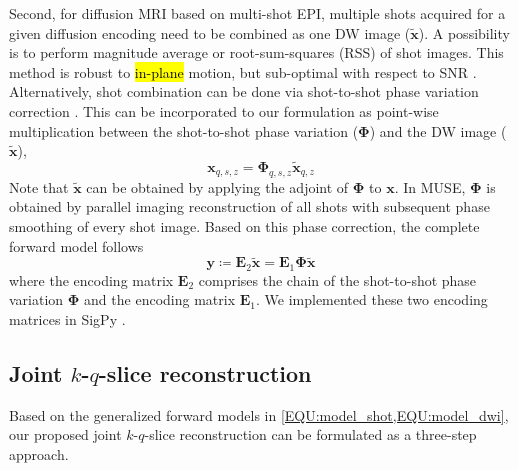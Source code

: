 \documentclass[preprint,12pt,authoryear,review]{elsarticle}
\begin{document}
    Second, for diffusion MRI based on multi-shot EPI,
    multiple shots acquired for a given diffusion encoding
    need to be combined as one DW image ($\mathbf{\tilde{x}}$).
    A possibility is to perform magnitude average \citep{chen_2013_muse}
    or root-sum-squares (RSS) \citep{mani_2017_mussels}
    of shot images.
    This method is robust to \hl{in-plane} motion, 
    but sub-optimal with respect to SNR
    \citep{guhaniyogi_2016_amuse}.
    Alternatively, shot combination can be done via shot-to-shot phase variation correction
    \citep{liu_2005_moco_diff,chen_2013_muse}.
    This can be incorporated to our formulation as point-wise multiplication
    between the shot-to-shot phase variation ($\mathbf{\Phi}$) and
    the DW image ($\mathbf{\tilde{x}}$),
    \begin{equation}
         \mathbf{x}_{q,s,z} = \mathbf{\Phi}_{q,s,z} \mathbf{\tilde{x}}_{q,z}
    \end{equation}
    Note that $\mathbf{\tilde{x}}$ can be obtained
    by applying the adjoint of $\mathbf{\Phi}$ to $\mathbf{x}$.
    In MUSE, $\mathbf{\Phi}$ is obtained by parallel imaging reconstruction of all shots
    with subsequent phase smoothing of every shot image.
    Based on this phase correction, the complete forward model follows
    \begin{equation}
        \mathbf{y} \coloneqq \mathbf{E}_2 \mathbf{\tilde{x}} = \mathbf{E}_1 \mathbf{\Phi} \mathbf{\tilde{x}}
        \label{EQU:model_dwi}
    \end{equation}
    where the encoding matrix $\mathbf{E}_2$ comprises the chain of
    the shot-to-shot phase variation $\mathbf{\Phi}$ and
    the encoding matrix $\mathbf{E}_1$.
    We implemented these two encoding matrices in SigPy \citep{ong_2019_sigpy}.


    \subsection{Joint $k$-$q$-slice reconstruction}

    Based on the generalized forward models in \cref{EQU:model_shot,EQU:model_dwi},
    our proposed joint $k$-$q$-slice reconstruction can be formulated as a three-step approach.
\end{document}
